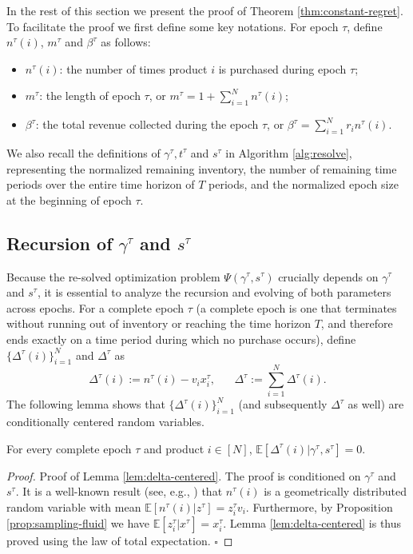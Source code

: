 \documentclass[opre]{informs3aa}
\begin{document}
In the rest of this section we present the proof of Theorem \ref{thm:constant-regret}.
To facilitate the proof we first define some key notations.
For epoch $\tau$, define $n^\tau(i)$, $m^\tau$ and $\beta^\tau$ as follows:
\begin{itemize}
\item[-] $n^\tau(i)$: the number of times product $i$ is purchased during epoch $\tau$;
\item[-] $m^\tau$: the length of epoch $\tau$, or $m^\tau=1+\sum_{i=1}^Nn^\tau(i)$;
\item[-] $\beta^\tau$: the total revenue collected during the epoch $\tau$, or $\beta^\tau=\sum_{i=1}^Nr_i n^\tau(i)$.
\end{itemize}
We also recall the definitions of $\gamma^\tau,t^\tau$ and $s^\tau$ in Algorithm \ref{alg:resolve},
representing the normalized remaining inventory, the number of remaining time periods over the entire time horizon of $T$ periods, and the normalized epoch size
at the beginning of epoch $\tau$.

\subsection{Recursion of $\gamma^\tau$ and $s^\tau$}

Because the re-solved optimization problem $\Psi(\gamma^\tau,s^\tau)$ crucially depends on $\gamma^\tau$ and $s^\tau$,
it is essential to analyze the recursion and evolving of both parameters across epochs.
For a complete epoch $\tau$ (a complete epoch is one that terminates without running out of inventory or reaching the time horizon $T$, and {therefore ends exactly on a time period during which no purchase occurs}), 
define $\{\Delta^\tau(i)\}_{i=1}^N$ and $\Delta^\tau$ as
\begin{equation}
\textstyle
\Delta^\tau(i) := n^\tau(i) - v_ix^\tau_i,\;\;\;\;\;\; \Delta^\tau := \sum_{i=1}^N \Delta^\tau(i).
\label{eq:delta}
\end{equation}
The following lemma shows that $\{\Delta^\tau(i)\}_{i=1}^N$ (and subsequently $\Delta^\tau$ as well) are conditionally centered random variables.
\begin{lemma}
For every complete epoch $\tau$ and product $i\in[N]$, $\mathbb E[\Delta^\tau(i)|\gamma^\tau,s^\tau] = 0$.
\label{lem:delta-centered}
\end{lemma}
\begin{proof}{Proof of Lemma \ref{lem:delta-centered}.}
The proof is conditioned on $\gamma^\tau$ and $s^\tau$.
It is a well-known result (see, e.g., \cite[Corollary A.1]{agrawal2019mnl}) that $n^\tau(i)$ is a geometrically distributed random variable
with mean $\mathbb E[n^\tau(i)|z^\tau] = z^\tau_iv_i$.
Furthermore, by Proposition \ref{prop:sampling-fluid} we have $\mathbb E[z^\tau_i|x^\tau] = x^\tau_i$.
Lemma \ref{lem:delta-centered} is thus proved using the law of total expectation. $\square$
\end{proof}
\end{document}
